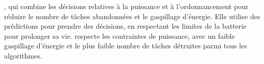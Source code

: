 \emph{\systemName}, qui combine les décisions relatives à la puissance et à l'ordonnancement pour réduire le nombre de tâches abandonnées et le gaspillage d'énergie. Elle utilise des prédictions pour prendre des décisions, en respectant les limites de la batterie pour prolonger sa vie. \emph{\systemName} respecte les contraintes de puissance, avec un faible gaspillage d'énergie et le plus faible nombre de tâches détruites parmi tous les algorithmes.

